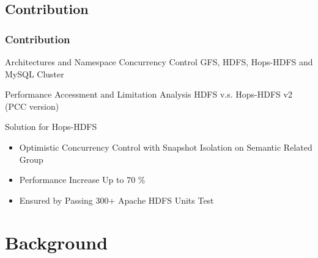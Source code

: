 \documentclass{beamer}
\begin{document}
\subsection{Contribution}
\begin{frame}
\frametitle{Contribution}
\begin{block}{Architectures and Namespace Concurrency Control}
GFS, HDFS, Hops-HDFS and MySQL Cluster
\end{block}

\begin{block}{Performance Accessment and Limitation Analysis}
HDFS v.s. Hops-HDFS v2 (PCC version)
\end{block}

\begin{block}{Solution for Hops-HDFS}
	\begin{itemize}
		\item Optimistic Concurrency Control with Snapshot Isolation on Semantic Related Group
		\item Performance Increase Up to 70 \%
		\item Ensured by Passing 300+ Apache HDFS Units Test
	\end{itemize}
\end{block}
\end{frame}

\section{Background}
\end{document}
